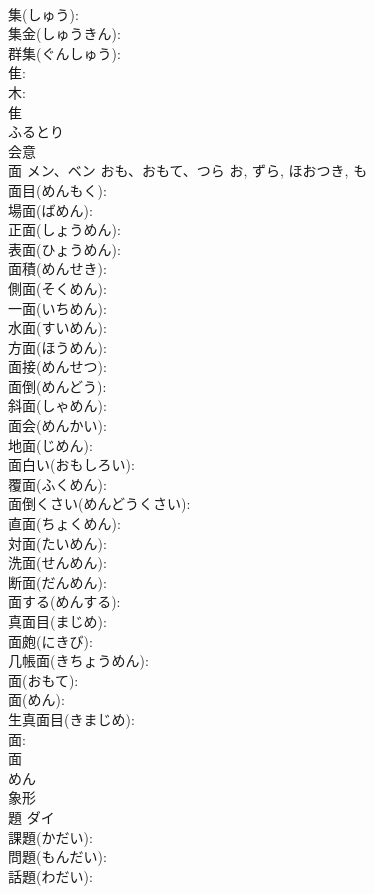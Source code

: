 \documentclass[8pt]{extreport}
\begin{document}
\begin{CJK}{UTF8}{min}
\\	集(しゅう): 
\\	集金(しゅうきん): 
\\	群集(ぐんしゅう): 
\\	隹: 
\\	木: 
\\	隹	
\\	ふるとり	
\\	会意 
\\	面	メン、ベン	おも、おもて、つら	お, ずら, ほおつき, も	
\\	面目(めんもく): 
\\	場面(ばめん): 
\\	正面(しょうめん): 
\\	表面(ひょうめん): 
\\	面積(めんせき): 
\\	側面(そくめん): 
\\	一面(いちめん): 
\\	水面(すいめん): 
\\	方面(ほうめん): 
\\	面接(めんせつ): 
\\	面倒(めんどう): 
\\	斜面(しゃめん): 
\\	面会(めんかい): 
\\	地面(じめん): 
\\	面白い(おもしろい): 
\\	覆面(ふくめん): 
\\	面倒くさい(めんどうくさい): 
\\	直面(ちょくめん): 
\\	対面(たいめん): 
\\	洗面(せんめん): 
\\	断面(だんめん): 
\\	面する(めんする): 
\\	真面目(まじめ): 
\\	面皰(にきび): 
\\	几帳面(きちょうめん): 
\\	面(おもて): 
\\	面(めん): 
\\	生真面目(きまじめ): 
\\	面: 
\\	面	
\\	めん	
\\	象形 
\\	題	ダイ			
\\	課題(かだい): 
\\	問題(もんだい): 
\\	話題(わだい): 

\end{CJK}
\end{document}
